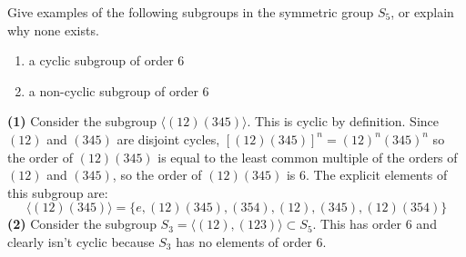 \begin{problem}
Give examples of the following subgroups in the symmetric group $S_5$, or explain why none exists.
\begin{enumerate}
  \item a cyclic subgroup of order 6
  \item a non-cyclic subgroup of order 6
\end{enumerate}
\end{problem}

\textbf{(1)} Consider the subgroup $\big\langle(12)(345)\big\rangle$. This is cyclic by definition. Since $(12)$ and $(345)$ are disjoint cycles, $\left[(12)(345)\right]^n=(12)^n(345)^n$ so the order of $(12)(345)$ is equal to the least common multiple of the orders of $(12)$ and $(345)$, so the order of $(12)(345)$ is $6$. The explicit elements of this subgroup are:
\[
  \big\langle(12)(345)\big\rangle = \{e, (12)(345), (354), (12), (345), (12)(354)\}
\] 
\textbf{(2)} Consider the subgroup $S_3 = \big\langle (12), (123) \big\rangle \subset S_5$. This has order $6$ and clearly isn't cyclic because $S_3$ has no elements of order $6$.  
